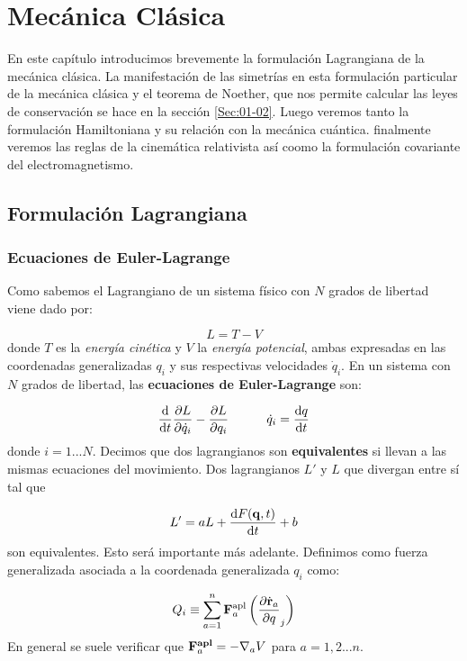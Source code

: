 \chapter{Mecánica Clásica}

En este capítulo introducimos brevemente la formulación Lagrangiana de la mecánica clásica. La manifestación de las simetrías en esta formulación particular de la mecánica clásica y el teorema de Noether, que nos permite calcular las leyes de conservación se hace en la sección \ref{Sec:01-02}. Luego veremos tanto la formulación Hamiltoniana y su relación con la mecánica cuántica. finalmente veremos las reglas de la cinemática relativista así coomo la formulación covariante del electromagnetismo. 

\section{Formulación Lagrangiana}

\subsection{Ecuaciones de Euler-Lagrange}

Como sabemos el Lagrangiano de un sistema físico con $N$ grados de libertad viene dado por:

\begin{equation}
	L = T - V
\end{equation}
donde $T$ es la \textit{energía cinética} y $V$ la \textit{energía potencial}, ambas expresadas en las coordenadas generalizadas $q_i$ y sus respectivas velocidades $\dot{q}_i$. En un sistema con $N$ grados de libertad, las \textbf{ecuaciones de Euler-Lagrange} son: 

\begin{equation}
	\frac{\mathrm{d} }{\mathrm{d} t} \frac{\partial L}{\partial \dot{q}_i} - \frac{\partial L}{\partial q_i} \quad \quad \quad \dot{q}_i = \frac{\mathrm{d} q}{\mathrm{d} t}
\end{equation} 
donde $i=1...N$. Decimos que dos lagrangianos son \textbf{equivalentes} si llevan a las mismas ecuaciones del movimiento. Dos lagrangianos $L'$ y $L$ que divergan entre sí tal que

\begin{equation}
	L' = aL  + \frac{\mathrm{d} F(\mathbf{q},t)}{\mathrm{d} t} + b
\end{equation} 
son equivalentes. Esto será importante más adelante. Definimos como fuerza generalizada asociada a la coordenada generalizada $q_i$ como:

\begin{equation}
	Q_i \equiv \sum_{a=1}^n \mathbf{F}_a^{\text{apl}} \left( \frac{\partial \dot{\mathbf{r}}_a}{\partial q}_j \right)
\end{equation}
En general se suele verificar que $\mathbf{F}_a^{\textbf{apl}}=-\nabla_aV$ para $a=1,2...n$. 

